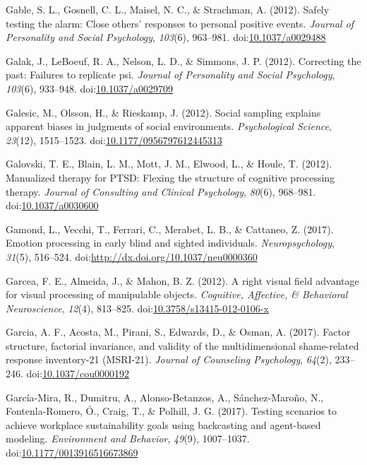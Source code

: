 \documentclass[english,man]{apa6}
\theoremstyle{definition}
\theoremstyle{definition}
\theoremstyle{definition}
\theoremstyle{remark}
\begin{document}
\hypertarget{ref-Gable2012}{}
Gable, S. L., Gosnell, C. L., Maisel, N. C., \& Strachman, A. (2012).
Safely testing the alarm: Close others' responses to personal positive
events. \emph{Journal of Personality and Social Psychology},
\emph{103}(6), 963--981.
doi:\href{https://doi.org/10.1037/a0029488}{10.1037/a0029488}

\hypertarget{ref-Galak2012}{}
Galak, J., LeBoeuf, R. A., Nelson, L. D., \& Simmons, J. P. (2012).
Correcting the past: Failures to replicate psi. \emph{Journal of
Personality and Social Psychology}, \emph{103}(6), 933--948.
doi:\href{https://doi.org/10.1037/a0029709}{10.1037/a0029709}

\hypertarget{ref-Galesic2012}{}
Galesic, M., Olsson, H., \& Rieskamp, J. (2012). Social sampling
explains apparent biases in judgments of social environments.
\emph{Psychological Science}, \emph{23}(12), 1515--1523.
doi:\href{https://doi.org/10.1177/0956797612445313}{10.1177/0956797612445313}

\hypertarget{ref-Galovski2012}{}
Galovski, T. E., Blain, L. M., Mott, J. M., Elwood, L., \& Houle, T.
(2012). Manualized therapy for PTSD: Flexing the structure of cognitive
processing therapy. \emph{Journal of Consulting and Clinical
Psychology}, \emph{80}(6), 968--981.
doi:\href{https://doi.org/10.1037/a0030600}{10.1037/a0030600}

\hypertarget{ref-Gamond2017}{}
Gamond, L., Vecchi, T., Ferrari, C., Merabet, L. B., \& Cattaneo, Z.
(2017). Emotion processing in early blind and sighted individuals.
\emph{Neuropsychology}, \emph{31}(5), 516--524.
doi:\href{https://doi.org/http://dx.doi.org/10.1037/neu0000360}{http://dx.doi.org/10.1037/neu0000360}

\hypertarget{ref-Garcea2012}{}
Garcea, F. E., Almeida, J., \& Mahon, B. Z. (2012). A right visual field
advantage for visual processing of manipulable objects. \emph{Cognitive,
Affective, \& Behavioral Neuroscience}, \emph{12}(4), 813--825.
doi:\href{https://doi.org/10.3758/s13415-012-0106-x}{10.3758/s13415-012-0106-x}

\hypertarget{ref-Garcia2017}{}
Garcia, A. F., Acosta, M., Pirani, S., Edwards, D., \& Osman, A. (2017).
Factor structure, factorial invariance, and validity of the
multidimensional shame-related response inventory-21 (MSRI-21).
\emph{Journal of Counseling Psychology}, \emph{64}(2), 233--246.
doi:\href{https://doi.org/10.1037/cou0000192}{10.1037/cou0000192}

\hypertarget{ref-Garcia-Mira2017}{}
García-Mira, R., Dumitru, A., Alonso-Betanzos, A., Sánchez-Maroño, N.,
Fontenla-Romero, Ó., Craig, T., \& Polhill, J. G. (2017). Testing
scenarios to achieve workplace sustainability goals using backcasting
and agent-based modeling. \emph{Environment and Behavior}, \emph{49}(9),
1007--1037.
doi:\href{https://doi.org/10.1177/0013916516673869}{10.1177/0013916516673869}
\end{document}
